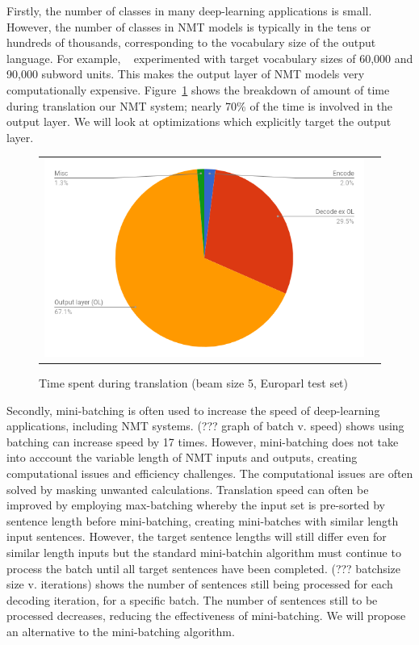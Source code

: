 \documentclass[11pt,a4paper]{article}
\begin{document}
Firstly, the number of classes in many deep-learning applications is small. However, the number of classes in NMT models is typically in the tens or hundreds of thousands, corresponding to the vocabulary size of the output language. For example, ~\cite{sennrich-haddow-birch:2016:P16-12} experimented with target vocabulary sizes of 60,000 and 90,000 subword units. This makes the output layer of NMT models very computationally expensive. Figure~\ref{fig:pie-time} shows the breakdown of amount of time during translation our NMT system; nearly 70\% of the time is involved in the output layer. We will look at optimizations which explicitly target the output layer.
\begin{figure}
\centering
\begin{tabular}{cc}
{\includegraphics[scale=0.3]{pie-time-europarl.png}} 
\end{tabular}
\caption{Time spent during translation (beam size 5, Europarl test set)}
\label{fig:pie-time}
\end{figure} 

Secondly, mini-batching is often used to increase the speed of deep-learning applications, including NMT systems. (??? graph of batch v. speed) shows using batching can increase speed by 17 times. However, mini-batching does not take into acccount the variable length of NMT inputs and outputs, creating computational issues and efficiency challenges. The computational issues are often solved by masking unwanted calculations. Translation speed can often be improved by employing max-batching whereby the input set is pre-sorted by sentence length before mini-batching, creating mini-batches with similar length input sentences. However, the target sentence lengths will still differ even for similar length inputs but the standard mini-batchin algorithm must continue to process the batch until all target sentences have been completed. (??? batchsize size v. iterations) shows the number of sentences still being processed for each decoding iteration, for a specific batch. The number of sentences still to be processed decreases, reducing the effectiveness of mini-batching. We will propose an alternative to the mini-batching algorithm.
\end{document}
